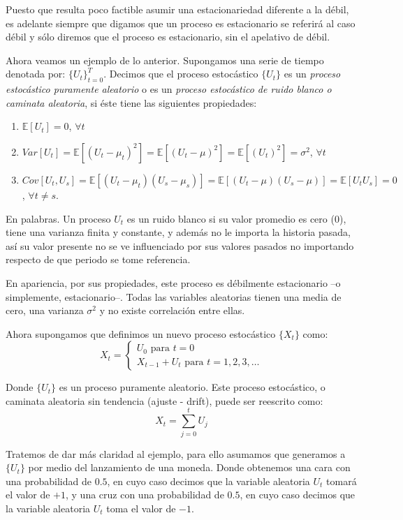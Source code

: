 \documentclass[
  a4paper,
]{article}
\begin{document}
Puesto que resulta poco factible asumir una estacionariedad diferente a
la débil, es adelante siempre que digamos que un proceso es estacionario
se referirá al caso débil y sólo diremos que el proceso es estacionario,
sin el apelativo de débil.

Ahora veamos un ejemplo de lo anterior. Supongamos una serie de tiempo
denotada por: \(\{U_t\}^T_{t = 0}\). Decimos que el proceso estocástico
\(\{U_t\}\) es un \textit{proceso estocástico puramente aleatorio} o es
un \textit{proceso estocástico de ruido blanco o caminata aleatoria}, si
éste tiene las siguientes propiedades:

\begin{enumerate}
    \item $\mathbb{E}[U_t] = 0$, $\forall t$
    \item $Var[U_t] = \mathbb{E}[(U_t - \mu_t)^2] = \mathbb{E}[(U_t - \mu)^2] = \mathbb{E}[(U_t)^2] = \sigma^2$, $\forall t$
    \item $Cov[U_t,U_s] = \mathbb{E}[(U_t - \mu_t)(U_s - \mu_s)] = \mathbb{E}[(U_t - \mu)(U_s - \mu)] = \mathbb{E}[U_t U_s] = 0$, $\forall t \neq s$.
\end{enumerate}

En palabras. Un proceso \(U_t\) es un ruido blanco si su valor promedio
es cero (0), tiene una varianza finita y constante, y además no le
importa la historia pasada, así su valor presente no se ve influenciado
por sus valores pasados no importando respecto de que periodo se tome
referencia.

En apariencia, por sus propiedades, este proceso es débilmente
estacionario --o simplemente, estacionario--. Todas las variables
aleatorias tienen una media de cero, una varianza \(\sigma^2\) y no
existe correlación entre ellas.

Ahora supongamos que definimos un nuevo proceso estocástico \(\{X_t\}\)
como: \[
    X_t = \left\{ \begin{array}{l} U_0  \mbox{ para } t = 0 \\ X_{t-1} + U_t \mbox{ para } t = 1, 2, 3, \ldots \end{array}\right.
\]

Donde \(\{ U_t \}\) es un proceso puramente aleatorio. Este proceso
estocástico, o caminata aleatoria sin tendencia (ajuste - drift), puede
ser reescrito como: \[
    X_t = \sum^t_{j = 0} U_j
\]

Tratemos de dar más claridad al ejemplo, para ello asumamos que
generamos a \(\{U_t\}\) por medio del lanzamiento de una moneda. Donde
obtenemos una cara con una probabilidad de \(0.5\), en cuyo caso decimos
que la variable aleatoria \(U_t\) tomará el valor de \(+1\), y una cruz
con una probabilidad de \(0.5\), en cuyo caso decimos que la variable
aleatoria \(U_t\) toma el valor de \(-1\).
\end{document}
